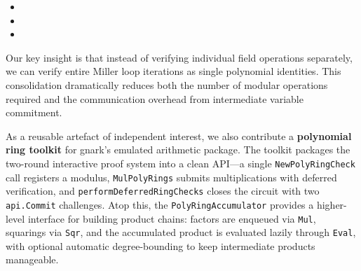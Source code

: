 \begin{itemize}
\item {}
\item {}
\item {}
\end{itemize}

Our key insight is that instead of verifying individual field operations separately, we can verify entire Miller loop iterations as single polynomial identities. This consolidation dramatically reduces both the number of modular operations required and the communication overhead from intermediate variable commitment.

As a reusable artefact of independent interest, we also contribute a \textbf{polynomial ring toolkit} for gnark's emulated arithmetic package. The toolkit packages the two-round interactive proof system into a clean API---a single \texttt{NewPolyRingCheck} call registers a modulus, \texttt{MulPolyRings} submits multiplications with deferred verification, and \texttt{performDeferredRingChecks} closes the circuit with two \texttt{api.Commit} challenges. Atop this, the \texttt{PolyRingAccumulator} provides a higher-level interface for building product chains: factors are enqueued via \texttt{Mul}, squarings via \texttt{Sqr}, and the accumulated product is evaluated lazily through \texttt{Eval}, with optional automatic degree-bounding to keep intermediate products manageable.
